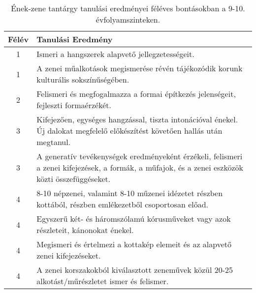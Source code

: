        
           \begin{longtable}{c | p{12cm} }
            \caption[Ének-zene 9-10.]{Ének-zene tantárgy tanulási eredményei féléves bontásokban a 9-10. évfolyamszinteken. }  \\

            \textbf{Félév} & \textbf{Tanulási Eredmény} \\
            \hline
            \endhead
                                
                                          1 &  Ismeri a hangszerek alapvető jellegzetességeit. \\ \hline
                                          1 &  A zenei műalkotások megismerése révén tájékozódik korunk kulturális sokszínűségében. \\ \hline
                                      
                                
                                          2 &  Felismeri és megfogalmazza a formai építkezés jelenségeit, fejleszti formaérzékét. \\ \hline
                                      
                                
                                          3 &  Kifejezően, egységes hangzással, tiszta intonációval énekel. Új dalokat megfelelő előkészítést követően hallás után megtanul. \\ \hline
                                          3 &  A generatív tevékenységek eredményeként érzékeli, felismeri a zenei kifejezések, a formák, a műfajok, és a zenei eszközök közti összefüggéseket. \\ \hline
                                      
                                
                                          4 &  8-10 népzenei, valamint 8-10 műzenei idézetet részben kottából, részben emlékezetből csoportosan előad. \\ \hline
                                          4 &  Egyszerű két- és háromszólamú kórusműveket vagy azok részleteit, kánonokat énekel. \\ \hline
                                          4 &  Megismeri és értelmezi a kottakép elemeit és az alapvető zenei kifejezéseket. \\ \hline
                                          4 &  A zenei korszakokból kiválasztott zeneművek közül 20-25 alkotást/műrészletet ismer és felismer. \\ \hline
                                      
                        \end{longtable}
            \clearpage

